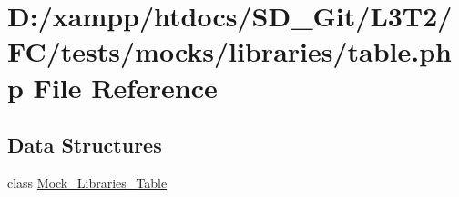 \hypertarget{tests_2mocks_2libraries_2_table_8php}{}\section{D\+:/xampp/htdocs/\+S\+D\+\_\+\+Git/\+L3\+T2/\+F\+C/tests/mocks/libraries/table.php File Reference}
\label{tests_2mocks_2libraries_2_table_8php}
\subsection*{Data Structures}
\begin{DoxyCompactItemize}
\item 
class \hyperlink{class_mock___libraries___table}{Mock\+\_\+\+Libraries\+\_\+\+Table}
\end{DoxyCompactItemize}
